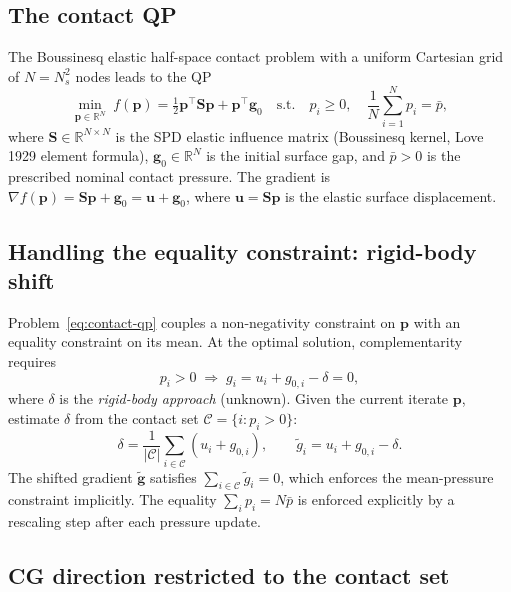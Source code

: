 \documentclass[11pt,a4paper]{article}
\newcommand{\R}{\mathbb{R}}
\newcommand{\bS}{\mathbf{S}}
\newcommand{\bp}{\mathbf{p}}
\newcommand{\bg}{\mathbf{g}}
\newcommand{\bu}{\mathbf{u}}
\newcommand{\calC}{\mathcal{C}}
\newcommand{\tr}{\top}
\begin{document}
\subsection{The contact QP}

The Boussinesq elastic half-space contact problem with a uniform Cartesian grid
of $N = N_s^2$ nodes leads to the QP
\begin{equation}
  \min_{\bp \in \R^N}\; f(\bp) = \tfrac{1}{2}\bp^\tr\bS\bp + \bp^\tr\bg_0
  \quad \text{s.t.}\quad p_i \geq 0,\quad \frac{1}{N}\sum_{i=1}^N p_i = \bar p,
  \label{eq:contact-qp}
\end{equation}
where $\bS \in \R^{N\times N}$ is the SPD elastic influence matrix (Boussinesq
kernel, Love 1929 element formula), $\bg_0 \in \R^N$ is the initial surface gap,
and $\bar p > 0$ is the prescribed nominal contact pressure.
The gradient is $\nabla f(\bp) = \bS\bp + \bg_0 = \bu + \bg_0$,
where $\bu = \bS\bp$ is the elastic surface displacement.

\subsection{Handling the equality constraint: rigid-body shift}

Problem~\eqref{eq:contact-qp} couples a non-negativity constraint on $\bp$
with an equality constraint on its mean.
At the optimal solution, complementarity requires
\begin{equation}
  p_i > 0 \;\Rightarrow\; g_i = u_i + g_{0,i} - \delta = 0,
  \label{eq:complementarity}
\end{equation}
where $\delta$ is the \emph{rigid-body approach} (unknown).
Given the current iterate $\bp$, estimate $\delta$ from the contact set
$\calC = \{i : p_i > 0\}$:
\begin{equation}
  \delta = \frac{1}{|\calC|}\sum_{i \in \calC}(u_i + g_{0,i}),
  \qquad \tilde g_i = u_i + g_{0,i} - \delta.
  \label{eq:shift}
\end{equation}
The shifted gradient $\tilde{\bg}$ satisfies $\sum_{i\in\calC}\tilde g_i = 0$,
which enforces the mean-pressure constraint implicitly.
The equality $\sum_i p_i = N\bar p$ is enforced explicitly by a rescaling step
after each pressure update.

\subsection{CG direction restricted to the contact set}
\end{document}

